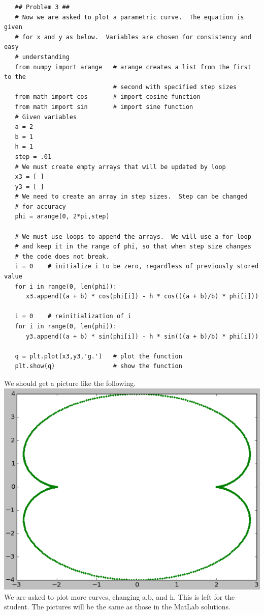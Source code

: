 \documentclass[11pt]{article}   %
\begin{document}
\begin{tcolorbox}
   \begin{lstlisting}
   ## Problem 3 ##
   # Now we are asked to plot a parametric curve.  The equation is given 
   # for x and y as below.  Variables are chosen for consistency and easy 
   # understanding
   from numpy import arange   # arange creates a list from the first to the 
                              # second with specified step sizes
   from math import cos       # import cosine function
   from math import sin       # import sine function
   # Given variables
   a = 2                      
   b = 1
   h = 1
   step = .01
   # We must create empty arrays that will be updated by loop
   x3 = [ ]
   y3 = [ ]
   # We need to create an array in step sizes.  Step can be changed 
   # for accuracy 
   phi = arange(0, 2*pi,step)

   # We must use loops to append the arrays.  We will use a for loop 
   # and keep it in the range of phi, so that when step size changes 
   # the code does not break.
   i = 0    # initialize i to be zero, regardless of previously stored value
   for i in range(0, len(phi)):  
      x3.append((a + b) * cos(phi[i]) - h * cos(((a + b)/b) * phi[i]))

   i = 0    # reinitialization of i
   for i in range(0, len(phi)):
      y3.append((a + b) * sin(phi[i]) - h * sin(((a + b)/b) * phi[i]))

   q = plt.plot(x3,y3,'g.')   # plot the function
   plt.show(q)                # show the function
   \end{lstlisting}
\end{tcolorbox}

We should get a picture like the following.
\\
\includegraphics[scale=0.75]{Hw1Fig3.png}
\\
We are asked to plot more curves, changing a,b, and h.  This is left for the student.  The pictures will be the same as those in the MatLab solutions.
\end{document}
